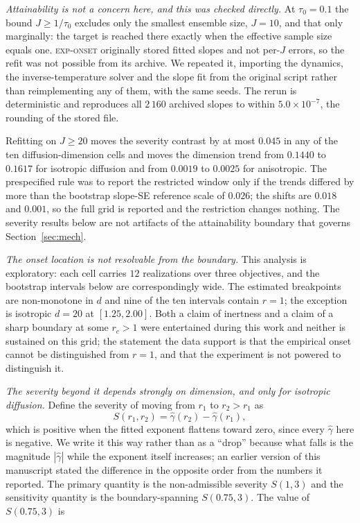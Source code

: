 \documentclass[pdflatex,sn-mathphys-num]{sn-jnl}
\theoremstyle{thmstyleone}
\theoremstyle{thmstyletwo}
\theoremstyle{thmstylethree}
\begin{document}
\emph{Attainability is not a concern here, and this was checked directly.} At $\tau_0=0.1$ the bound $J\ge1/\tau_0$ excludes only the smallest ensemble size, $J=10$, and that only marginally: the target is reached there exactly when the effective sample size equals one. \textsc{exp-onset} originally stored fitted slopes and not per-$J$ errors, so the refit was not possible from its archive. We repeated it, importing the dynamics, the inverse-temperature solver and the slope fit from the original script rather than reimplementing any of them, with the same seeds. The rerun is deterministic and reproduces all $2\,160$ archived slopes to within $5.0\times10^{-7}$, the rounding of the stored file.

Refitting on $J\ge20$ moves the severity contrast by at most $0.045$ in any of the ten diffusion-dimension cells and moves the dimension trend from $0.1440$ to $0.1617$ for isotropic diffusion and from $0.0019$ to $0.0025$ for anisotropic. The prespecified rule was to report the restricted window only if the trends differed by more than the bootstrap slope-SE reference scale of $0.026$; the shifts are $0.018$ and $0.001$, so the full grid is reported and the restriction changes nothing. The severity results below are not artifacts of the attainability boundary that governs Section~\ref{sec:mech}.

\emph{The onset location is not resolvable from the boundary.} This analysis is exploratory: each cell carries $12$ realizations over three objectives, and the bootstrap intervals below are correspondingly wide. The estimated breakpoints are non-monotone in $d$ and nine of the ten intervals contain $r=1$; the exception is isotropic $d=20$ at $[1.25,2.00]$. Both a claim of inertness and a claim of a sharp boundary at some $r_c>1$ were entertained during this work and neither is sustained on this grid; the statement the data support is that the empirical onset cannot be distinguished from $r=1$, and that the experiment is not powered to distinguish it.

\emph{The severity beyond it depends strongly on dimension, and only for isotropic diffusion.} Define the severity of moving from $r_1$ to $r_2>r_1$ as
\[
S(r_1,r_2)=\hat\gamma(r_2)-\hat\gamma(r_1),
\]
which is positive when the fitted exponent flattens toward zero, since every $\hat\gamma$ here is negative. We write it this way rather than as a ``drop'' because what falls is the magnitude $|\hat\gamma|$ while the exponent itself increases; an earlier version of this manuscript stated the difference in the opposite order from the numbers it reported. The primary quantity is the non-admissible severity $S(1,3)$ and the sensitivity quantity is the boundary-spanning $S(0.75,3)$. The value of $S(0.75,3)$ is
\end{document}
